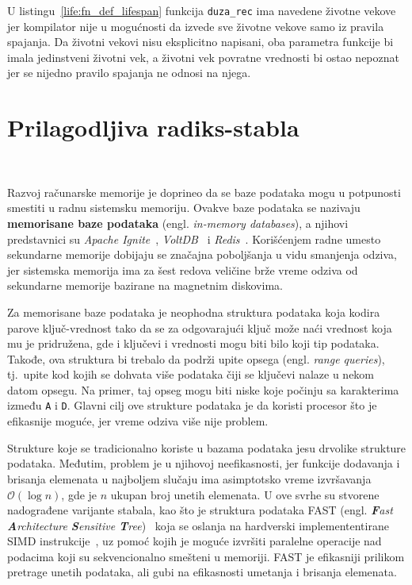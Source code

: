 \documentclass[12pt,oneside]{memoir}
\begin{document}
U listingu~\ref{life:fn_def_lifespan} funkcija \texttt{duza\_rec} ima navedene životne
vekove jer kompilator nije u mogućnosti da izvede sve životne vekove samo iz
pravila spajanja. Da životni vekovi nisu eksplicitno napisani, oba parametra funkcije
bi imala jedinstveni životni vek, a životni vek povratne vrednosti bi ostao nepoznat
jer se nijedno pravilo spajanja ne odnosi na njega.


\chapter{Prilagodljiva radiks-stabla}~\label{ch:art}

Razvoj računarske memorije je doprineo da se baze podataka
mogu u potpunosti smestiti u radnu sistemsku memoriju. Ovakve baze podataka se nazivaju
\textbf{memorisane baze podataka} (engl. \emph{in-memory databases}), a njihovi predstavnici su
\emph{Apache Ignite}~\cite{apacheIgnite}, \emph{VoltDB}~\cite{voltDB} i
\emph{Redis}~\cite{redis}. Korišćenjem radne umesto sekundarne
memorije dobijaju se značajna poboljšanja u vidu smanjenja odziva, jer sistemska memorija
ima za šest redova veličine brže vreme odziva
od sekundarne memorije bazirane na magnetnim diskovima.

Za memorisane baze podataka je neophodna struktura podataka koja kodira parove
ključ-vrednost tako da se za odgovarajući ključ može naći vrednost koja mu
je pridružena, gde i ključevi i vrednosti mogu biti bilo koji tip podataka.
Takođe, ova struktura bi trebalo da podrži upite opsega
(engl. \emph{range queries}), tj.\ upite kod kojih se dohvata više podataka
čiji se ključevi nalaze u nekom datom opsegu.
Na primer, taj opseg mogu biti niske koje počinju sa karakterima između
\texttt{A} i \texttt{D}.
Glavni cilj ove strukture podataka je da koristi procesor što je efikasnije moguće, jer
vreme odziva više nije problem.

Strukture koje se tradicionalno koriste u bazama podataka jesu
drvolike strukture podataka. Međutim, problem je u njihovoj neefikasnosti, jer
funkcije dodavanja i brisanja elemenata u najboljem slučaju ima asimptotsko vreme izvršavanja
$ \mathcal{O}(\log{}n) $, gde je $n$ ukupan broj unetih elemenata.
U ove svrhe su stvorene nadograđene varijante stabala,
kao što je struktura podataka FAST
(engl. \emph{\textbf{F}ast \textbf{A}rchitecture \textbf{S}ensitive \textbf{T}ree})~\cite{fast}
koja se oslanja na hardverski implemententirane SIMD instrukcije~\cite{simd},
uz pomoć kojih je moguće izvršiti paralelne operacije nad podacima koji su
sekvencionalno smešteni u memoriji.
FAST je efikasniji prilikom pretrage unetih podataka,
ali gubi na efikasnosti umetanja i brisanja elemenata.
\end{document}
